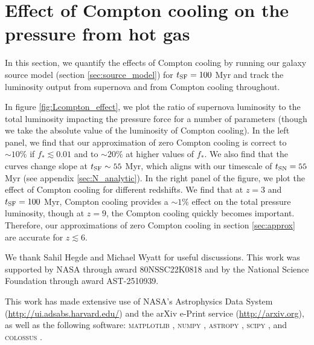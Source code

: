 \documentclass[a4paper,11pt]{article}
\begin{document}
\section{Effect of Compton cooling on the pressure from hot gas} \label{sec:compton_cooling_approx}

In this section, we quantify the effects of Compton cooling by running our galaxy source model (section \ref{sec:source_model}) for $t_{\rm SF} = 100$ Myr and track the luminosity output from supernova and from Compton cooling throughout.

In figure \ref{fig:Lcompton_effect}, we plot the ratio of supernova luminosity to the total luminosity impacting the pressure force for a number of parameters (though we take the absolute value of the luminosity of Compton cooling). In the left panel, we find that our approximation of zero Compton cooling is correct to $\sim 10 \%$ if $f_{*} \lesssim 0.01$
and to $\sim 20 \%$ at higher values of $f_{*}$. We also find that the curves change slope at $t_{\rm SF} \sim 55$ Myr, which aligns with our timescale of $t_{\rm SN} = 55$ Myr (see appendix \ref{sec:N_analytic}). In the right panel of the figure, we plot the effect of Compton cooling for different redshifts. We find that at $z = 3$ and $t_{\rm SF} = 100$ Myr, Compton cooling provides a $\sim 1 \%$ effect on the total pressure luminosity, though at $z = 9$, the Compton cooling quickly becomes important. Therefore, our approximations of zero Compton cooling in section \ref{sec:approx} are accurate for $z \lesssim 6$.

\acknowledgments
We thank Sahil Hegde and Michael Wyatt for useful discussions. This work was supported by NASA through award 80NSSC22K0818 and by the National Science Foundation through award AST-2510939.

This work has made extensive use of NASA's Astrophysics Data System (\href{http://ui.adsabs.harvard.edu/}{http://ui.adsabs.harvard.edu/}) and the arXiv e-Print service (\href{http://arxiv.org}{http://arxiv.org}), as well as the following software: \textsc{matplotlib} \cite{Matplotlib}, \textsc{numpy} \cite{numpy}, \textsc{astropy} \cite{Astropy}, \textsc{scipy} \cite{Scipy}, and \textsc{colossus} \cite{Diemer2018_colossus2}.

{}

\end{document}
